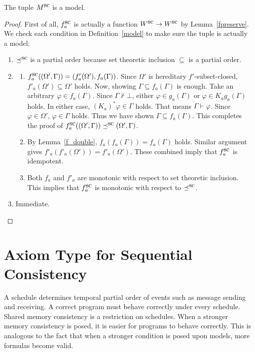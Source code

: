 \begin{lemma}
The tuple $M^{\mbox{sc}}$ is a model.
\end{lemma}
\begin{proof}
First of all, $f^{\mbox{sc}}_a$ is actually a function $W^{\mbox{sc}}\rightarrow W^{\mbox{sc}}$ by Lemma~\ref{fpreserve}.
We check each condition in Definition~\ref{model} to
 make sure the tuple is actually a model:
 \begin{enumerate}
  \item $\preceq^{\mbox{sc}}$ is a partial order because set theoretic inclusion $\subseteq$ is a
	partial order.
  \item 
\begin{enumerate}
 \item $f^{\mbox{sc}}_a((\Omega', \Gamma)) = (f'_a(\Omega'), f_a(\Gamma))$.
       Since $\Omega'$ is hereditary $f'$-subset-closed,
       $f'_a(\Omega')\subseteq \Omega'$ holds.
       Now, showing $\Gamma\subseteq f_a(\Gamma)$ is enough.
       Take an arbitrary $\varphi\in f_a(\Gamma)$.
       Since $\Gamma\not\vdash\bot$,
       either $\varphi\in g_a(\Gamma)$ or $\varphi\in K_ag_a(\Gamma)$ holds.
       In either case, $(K_a)^*\varphi \in \Gamma$ holds.
       That means $\Gamma\vdash\varphi$.
       Since $\varphi\in\Omega'$, $\varphi \in \Gamma$ holds.
       Thus we have shown $\Gamma\subseteq f_a(\Gamma)$.
       This completes the proof of 
       $f^{\mbox{sc}}_a((\Omega', \Gamma)) \preceq^{\mbox{sc}} (\Omega', \Gamma)$.
 \item By Lemma~\ref{f_double},
       $f_a(f_a(\Gamma)) = f_a(\Gamma)$ holds.
       Similar argument gives $f'_a(f'_a(\Omega')) = f'_a(\Omega')$.
       These combined imply that $f^{\mbox{sc}}_a$ is idempotent.
 \item Both $f_a$ and $f'_a$ are monotonic with respect to set theoretic inclusion.
       This implies that $f^{\mbox{sc}}_a$ is monotonic with respect to $\preceq^{\mbox{sc}}$.
\end{enumerate}
  \item Immediate.
 \end{enumerate}
\end{proof}


\section{Axiom Type for Sequential Consistency}
\label{sc}

A schedule determines temporal partial order of events such as
message sending and receiving.
A correct program must behave correctly under every schedule.
Shared memory consistency is a restriction on schedules.
When a stronger memory consistency is posed, it is easier for programs to behave
correctly.  This is analogous to the fact
that when a stronger condition
is posed upon models, more formulas become valid.

